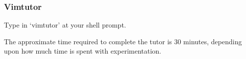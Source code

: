 \begin{frame}[fragile]
  \frametitle{Vimtutor}
  Type in `vimtutor' at your shell prompt.

  \vspace{1cm}

  The approximate time required to complete the tutor is 30 minutes, depending
  upon how much time is spent with experimentation.
\end{frame}
